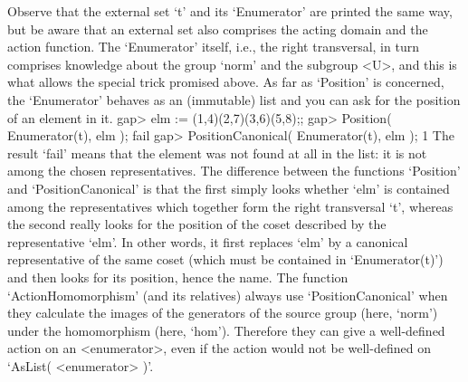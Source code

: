 %

%
Observe  that the external set `t'  and  its `Enumerator' are printed the
same way, but  be aware that an   external set also comprises  the acting
domain  and the action function.  The  `Enumerator' itself, i.e.,  the
right transversal, in turn comprises knowledge about the group `norm' and
the  subgroup <U>,  and  this is what  allows  the special trick promised
above. As far as `Position' is  concerned, the `Enumerator' behaves as an
(immutable) list and you can ask for the position of an element in it.
\beginexample
gap> elm := (1,4)(2,7)(3,6)(5,8);;
gap> Position( Enumerator(t), elm );
fail
gap> PositionCanonical( Enumerator(t), elm );
1
\endexample
{}%
The result `fail'   means that the element was   not found at  all in the
list: it is not among the chosen  representatives. The difference between
the functions `Position' and `PositionCanonical' is that the first simply
looks whether `elm' is contained among the representatives which together
form the  right transversal `t', whereas  the second really looks for the
position of the  coset described by  the  representative `elm'. In  other
words, it first replaces `elm' by a  canonical representative of the same
coset (which must be contained in `Enumerator(t)') and then looks for its
position, hence the name. The  function `ActionHomomorphism' (and  its
relatives) always use  `PositionCanonical' when they calculate the images
of   the  generators of  the    source  group (here,  `norm')   under the
homomorphism  (here, `hom').  Therefore  they  can  give a   well-defined
action on an   <enumerator>, even   if the   action  would not   be
well-defined on `AsList( <enumerator> )'.

